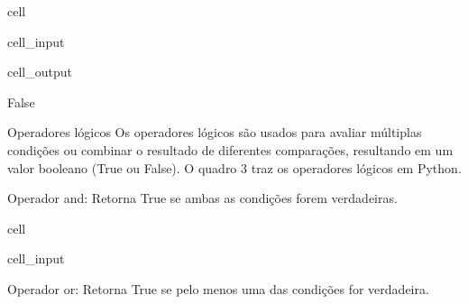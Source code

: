 \documentclass[letterpaper,10pt,english]{jupyterBook}
\begin{document}
\begin{sphinxuseclass}{cell}\begin{sphinxVerbatimInput}

\begin{sphinxuseclass}{cell_input}
\begin{sphinxVerbatim}[commandchars=\\\{\}]
\end{sphinxVerbatim}

\end{sphinxuseclass}\end{sphinxVerbatimInput}
\begin{sphinxVerbatimOutput}

\begin{sphinxuseclass}{cell_output}
\begin{sphinxVerbatim}[commandchars=\\\{\}]
False
\end{sphinxVerbatim}

\end{sphinxuseclass}\end{sphinxVerbatimOutput}

\end{sphinxuseclass}
\sphinxAtStartPar
Operadores lógicos
Os operadores lógicos são usados para avaliar múltiplas condições ou combinar o resultado de diferentes comparações, resultando em um valor booleano (True ou False). O quadro 3 traz os operadores lógicos em Python.

\sphinxAtStartPar
Operador and: Retorna True se ambas as condições forem verdadeiras.

\begin{sphinxuseclass}{cell}\begin{sphinxVerbatimInput}

\begin{sphinxuseclass}{cell_input}
\begin{sphinxVerbatim}[commandchars=\\\{\}]
  
  
\end{sphinxVerbatim}

\end{sphinxuseclass}\end{sphinxVerbatimInput}

\end{sphinxuseclass}
\sphinxAtStartPar
Operador or: Retorna True se pelo menos uma das condições for verdadeira.
\end{document}
